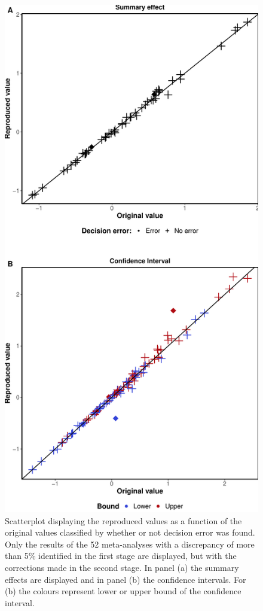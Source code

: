 \documentclass[
  ,apa7,floatsintext]{apa6}
\begin{document}
\begin{figure}
\centering
\includegraphics{manuscript_files/figure-latex/unnamed-chunk-4-1.pdf}
\caption{\label{fig:unnamed-chunk-4}Scatterplot displaying the reproduced values as a function of the original values classified by whether or not decision error was found. Only the results of the 52 meta-analyses with a discrepancy of more than 5\% identified in the first stage are displayed, but with the corrections made in the second stage. In panel (a) the summary effects are displayed and in panel (b) the confidence intervals. For (b) the colours represent lower or upper bound of the confidence interval.}
\end{figure}
\end{document}
